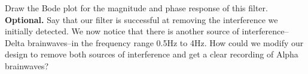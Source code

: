 \begin{enumerate}
\begin{enumerate}
        \qitem Draw the Bode plot for the magnitude and phase response of this filter.
	\sol {
	}	
	\\

        \qitem \textbf{Optional.} Say that our filter is successful at removing the interference we initially detected. We now notice that there is another source of interference--Delta brainwaves--in the frequency range 0.5Hz to 4Hz. How could we modify our design to remove both sources of interference and get a clear recording of Alpha brainwaves?
	\\

    \end{enumerate}
\end{enumerate}
